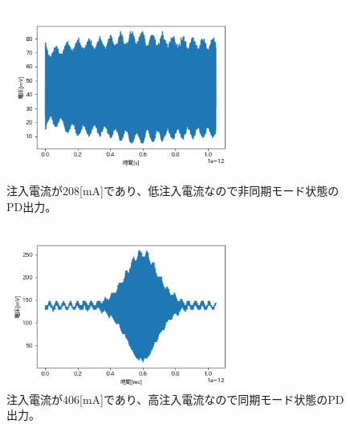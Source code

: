 \documentclass[titlepage]{jsarticle}
\begin{document}
\begin{figure}[htbp]
 \begin{minipage}{0.5\hsize}
  \begin{center}
   \includegraphics[width=80mm]{not_sync_208mAPD.png}
  \end{center}
  \caption{注入電流が208[mA]であり、低注入電流なので非同期モード状態のPD出力。}
  \label{fig:notsync}
 \end{minipage}
 \begin{minipage}{0.5\hsize}
  \begin{center}
   \includegraphics[width=80mm]{askT.png}
  \end{center}
  \caption{注入電流が406[mA]であり、高注入電流なので同期モード状態のPD出力。}
  \label{fig:sync}
 \end{minipage}
\end{figure}
\end{document}

